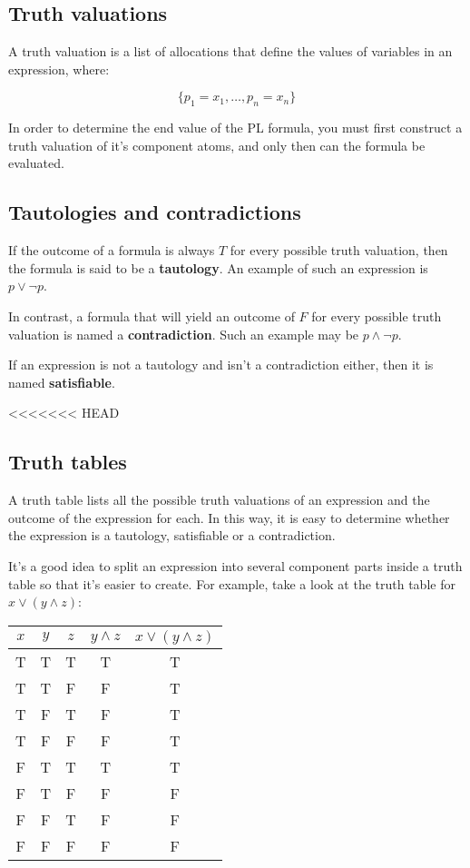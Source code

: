 \subsection{Truth valuations}

A truth valuation is a list of allocations that define the values of variables
in an expression, where:

\begin{dmath*}
	\{p_1=x_1,\dots, p_n=x_n\}
\end{dmath*}


In order to determine the end value of the PL formula, you must first construct
a truth valuation of it's component atoms, and only then can the formula be
evaluated.

\subsection{Tautologies and contradictions}

If the outcome of a formula is always $T$ for every possible truth valuation,
then the formula is said to be a {\bf tautology}. An example of such an
expression is $p \vee \neg p$.

In contrast, a formula that will yield an outcome of $F$ for every possible
truth valuation is named a {\bf contradiction}. Such an example may be $p \wedge
\neg p$.

If an expression is not a tautology and isn't a contradiction either, then it is
named {\bf satisfiable}.

<<<<<<< HEAD
\subsection{Truth tables}

A truth table lists all the possible truth valuations of an expression and the
outcome of the expression for each. In this way, it is easy to determine whether
the expression is a tautology, satisfiable or a contradiction.

It's a good idea to split an expression into several component parts inside a
truth table so that it's easier to create. For example, take a look at the truth
table for $x \vee (y \wedge z)$:

\begin{center}
	\begin{tabular}{|c c c|c|c|}
		\hline
		$x$ & $y$ & $z$ & $y \wedge z$ & $x \vee (y \wedge z)$\\ \hline
		T & T & T & T & T\\
		T & T & F & F & T\\
		T & F & T & F & T\\
		T & F & F & F & T\\
		F & T & T & T & T\\
		F & T & F & F & F\\
		F & F & T & F & F\\
		F & F & F & F & F\\ \hline
	\end{tabular}
\end{center}

